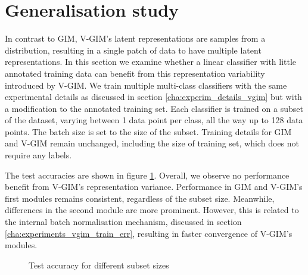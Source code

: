	\section{Generalisation study}
		In contrast to GIM, V-GIM's latent representations are samples from a distribution, resulting in a single patch of data to have multiple latent representations. In this section we examine whether a linear classifier with little annotated training data can benefit from this representation variability introduced by V-GIM. We train multiple multi-class classifiers with the same experimental details as discussed in section \ref{cha:experim_details_vgim} but with a modification to the annotated training set. Each classifier is trained on a subset of the dataset, varying between 1 data point per class, all the way up to 128 data points. The batch size is set to the size of the subset. Training details for GIM and V-GIM remain unchanged, including the size of training set, which does not require any labels.
		
		The test accuracies are shown in figure \ref{fig:subsets_experiment}. Overall, we observe no performance benefit from V-GIM's representation variance. Performance in GIM and V-GIM's first modules remains consistent, regardless of the subset size. Meanwhile, differences in the second module are more prominent. However, this is related to the internal batch normalisation mechanism, discussed in section \ref{cha:experiments_vgim_train_err}, resulting in faster convergence of V-GIM's modules.
		
		\begin{figure}[h] %
			\centering
			\begin{subfigure}[b]{0.4\textwidth}
				\centering
				
			\end{subfigure}
			\hfill
			\begin{subfigure}[b]{0.4\textwidth}
				\centering
				
			\end{subfigure}
			\caption{Test accuracy for different subset sizes}
			\label{fig:subsets_experiment}
		\end{figure}






	


